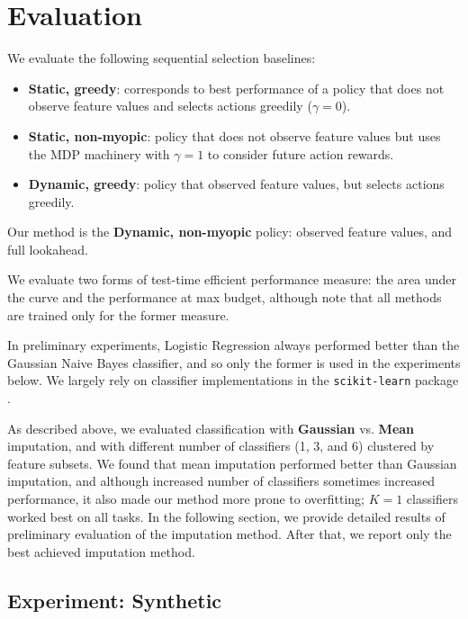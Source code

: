 \section{Evaluation}\label{sec:clf_eval}

We evaluate the following sequential selection baselines:
\begin{itemize}
\item \textbf{Static, greedy}: corresponds to best performance of a policy that does not observe feature values and selects actions greedily ($\gamma=0$).
\item \textbf{Static, non-myopic}: policy that does not observe feature values but uses the MDP machinery with $\gamma=1$ to consider future action rewards.
\item \textbf{Dynamic, greedy}: policy that observed feature values, but selects actions greedily.
\end{itemize}
Our method is the \textbf{Dynamic, non-myopic} policy: observed feature values, and full lookahead.

We evaluate two forms of test-time efficient performance measure: the area under the curve and the performance at max budget, although note that all methods are trained only for the former measure.

In preliminary experiments, Logistic Regression always performed better than the Gaussian Naive Bayes classifier, and so only the former is used in the experiments below.
We largely rely on classifier implementations in the \texttt{scikit-learn} package \parencite{Pedregosa2011}.

As described above, we evaluated classification with \textbf{Gaussian} vs. \textbf{Mean} imputation, and with different number of classifiers (1, 3, and 6) clustered by feature subsets.
We found that mean imputation performed better than Gaussian imputation, and although increased number of classifiers sometimes increased performance, it also made our method more prone to overfitting; $K=1$ classifiers worked best on all tasks.
In the following section, we provide detailed results of preliminary evaluation of the imputation method.
After that, we report only the best achieved imputation method.



\subsection{Experiment: Synthetic}




